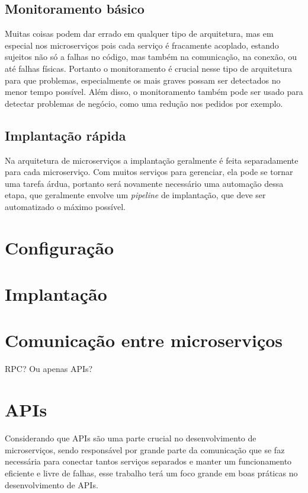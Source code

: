\subsection{Monitoramento básico}

Muitas coisas podem dar errado em qualquer tipo de arquitetura, mas em especial nos microserviços pois cada serviço é fracamente acoplado, estando sujeitos não só a falhas no código, mas também na comunicação, na conexão, ou até falhas físicas. Portanto o monitoramento é crucial nesse tipo de arquitetura para que problemas, especialmente os mais graves possam ser detectados no menor tempo possível. Além disso, o monitoramento também pode ser usado para detectar problemas de negócio, como uma redução nos pedidos por exemplo. \cite{MartinFowlerMicroservices}

\subsection{Implantação rápida}

Na arquitetura de microserviços a implantação geralmente é feita separadamente para cada microserviço. Com muitos serviços para gerenciar, ela pode se tornar uma tarefa árdua, portanto será novamente necessário uma automação dessa etapa, que geralmente envolve um \emph{pipeline} de implantação, que deve ser automatizado o máximo possível. \cite{MartinFowlerMicroservices}

\section{Configuração}

\section{Implantação}

\section{Comunicação entre microserviços}

RPC? Ou apenas APIs?

\section{APIs}

Considerando que APIs são uma parte crucial no desenvolvimento de microserviços, sendo responsável por grande parte da comunicação que se faz necessária para conectar tantos serviços separados e manter um funcionamento eficiente e livre de falhas, esse trabalho terá um foco grande em boas práticas no desenvolvimento de APIs.

